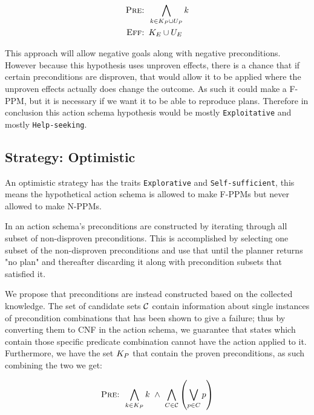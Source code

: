 \documentclass[\master/Master.tex]{subfiles}
\begin{document}
\begin{equation}
    \begin{split}			
        \textsc{Pre: } & \bigwedge\limits_{k \in K_P \cup U_P} k \\
        \textsc{Eff: } &  K_E \cup U_E
    \end{split}
\end{equation}

This approach will allow negative goals along with negative preconditions. 
However because this hypothesis uses unproven effects, there is a chance that if certain preconditions are disproven, that would allow it to be applied where the unproven effects actually does change the outcome.
As such it could make a F-PPM, but it is necessary if we want it to be able to reproduce plans. 
Therefore in conclusion this action schema hypothesis would be mostly \texttt{Exploitative} and mostly \texttt{Help-seeking}.
	
	

\subsection*{Strategy: Optimistic} 

	An optimistic strategy has the traits \texttt{Explorative} and \texttt{Self-sufficient},
	this means the hypothetical action schema is allowed to make F-PPMs but never allowed to make N-PPMs.

	In \cite{Walsh2008} an action schema's preconditions are constructed by iterating through all subset of non-disproven preconditions.
	This is accomplished by selecting one subset of the non-disproven preconditions and use that until the planner returns "no plan" and thereafter discarding it along with precondition subsets that satisfied it.

	We propose that preconditions are instead constructed based on the collected knowledge.
	The set of candidate sets $\mathcal{C}$ contain information about single instances of precondition combinations that has been shown to give a failure;
	thus by converting them to CNF in the action schema, we guarantee that states which contain those specific predicate combination cannot have the action applied to it.
	Furthermore, we have the set $K_P$ that contain the proven preconditions, as such combining the two we get:

	\begin{equation} \label{eq:nca:opt-preconds}
		\textsc{Pre: } 
		\bigwedge\limits_{k \in K_P} k ~ \land ~ \bigwedge \limits_{C \in \mathcal{C}} \left( \bigvee \limits_{p \in C} p\right)
	\end{equation}
\end{document}
